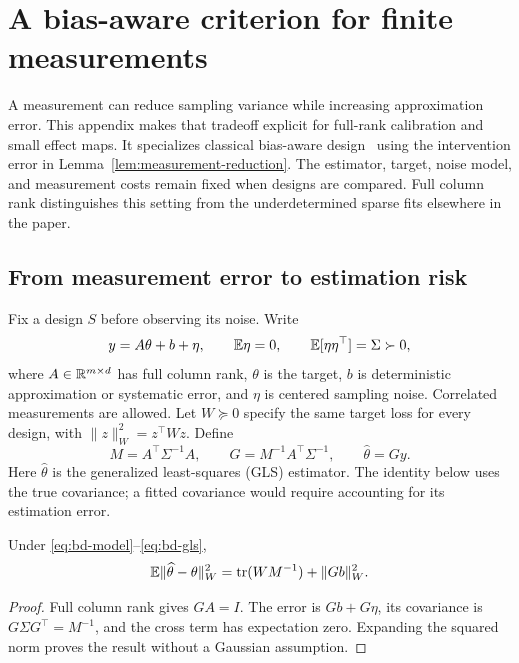 \FloatBarrier
\section{A bias-aware criterion for finite measurements}\label{app:bias-aware-design}

A measurement can reduce sampling variance while increasing approximation error.
This appendix makes that tradeoff explicit for full-rank calibration and small
effect maps. It specializes classical bias-aware design~\cite{box1959design}
using the intervention error in Lemma~\ref{lem:measurement-reduction}. The
estimator, target, noise model, and measurement costs remain fixed when designs
are compared. Full column rank distinguishes this setting from the
underdetermined sparse fits elsewhere in the paper.

\subsection{From measurement error to estimation risk}

Fix a design $S$ before observing its noise. Write
\begin{equation}\label{eq:bd-model}
 y=A\theta+b+\eta,\qquad \mathbb{E}\eta=0,\qquad
 \mathbb{E}[\eta\eta^\top]=\Sigma\succ0,
\end{equation}
where $A\in\mathbb{R}^{m\times d}$ has full column rank, $\theta$ is the target,
$b$ is deterministic approximation or systematic error, and $\eta$ is centered
sampling noise. Correlated measurements are allowed. Let $W\succeq0$ specify
the same target loss for every design, with $\|z\|_W^2=z^\top Wz$. Define
\begin{equation}\label{eq:bd-gls}
 M=A^\top\Sigma^{-1}A,\qquad
 G=M^{-1}A^\top\Sigma^{-1},\qquad \widehat\theta=Gy.
\end{equation}
Here $\widehat\theta$ is the generalized least-squares (GLS) estimator.
The identity below uses the true covariance; a fitted covariance would require
accounting for its estimation error.

\begin{proposition}\label{prop:bd-risk}
Under \eqref{eq:bd-model}--\eqref{eq:bd-gls},
\begin{equation}\label{eq:bd-risk}
 \mathbb{E}\|\widehat\theta-\theta\|_W^2
 =\operatorname{tr}(WM^{-1})+\|Gb\|_W^2.
\end{equation}
\end{proposition}
\begin{proof}
Full column rank gives $GA=I$. The error is $Gb+G\eta$, its covariance is
$G\Sigma G^\top=M^{-1}$, and the cross term has expectation zero. Expanding
the squared norm proves the result without a Gaussian assumption.
\end{proof}

